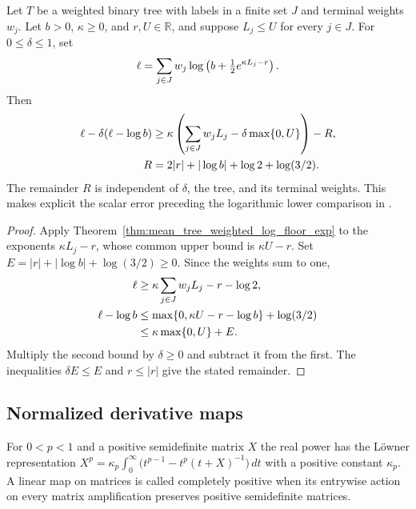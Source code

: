 \begin{theorem}
\label{thm:mean_tree_log_floor_deficit}
\leanok
{}
Let $T$ be a weighted binary tree with labels in a finite set $J$ and
terminal weights $w_j$. Let $b>0$, $\kappa\ge0$, and $r,U\in\mathbb R$,
and suppose $L_j\le U$ for every $j\in J$. For $0\le\delta\le1$, set
\begin{align}
 \ell=\sum_{j\in J}w_j\log\left(b+\tfrac12e^{\kappa L_j-r}\right).
 \notag
\end{align}
Then
\begin{align}
 \ell-\delta(\ell-\log b)
 &\ge\kappa\left(\sum_{j\in J}w_jL_j-\delta\max\{0,U\}\right)
       -R,\notag\\
 R&=2|r|+|\log b|+\log2+\log(3/2).
 \notag
\end{align}
The remainder $R$ is independent of $\delta$, the tree, and its terminal
weights. This makes explicit the scalar error preceding the logarithmic
lower comparison in \cite[Section~8]{OpenAI2026AreaLaw}.
\end{theorem}

\begin{proof}\leanok
{}
Apply Theorem~\ref{thm:mean_tree_weighted_log_floor_exp} to the exponents
$\kappa L_j-r$, whose common upper bound is $\kappa U-r$.
Set $E=|r|+|\log b|+\log(3/2)\ge0$. Since the weights sum to one,
\begin{align}
 \ell&\ge\kappa\sum_{j\in J}w_jL_j-r-\log2,\notag\\
 \ell-\log b
 &\le\max\{0,\kappa U-r-\log b\}+\log(3/2)\notag\\
 &\le\kappa\max\{0,U\}+E.
 \notag
\end{align}
Multiply the second bound by $\delta\ge0$ and subtract it
from the first. The inequalities $\delta E\le E$ and $r\le|r|$ give the
stated remainder.
\end{proof}

\subsection{Normalized derivative maps}

For $0<p<1$ and a positive semidefinite matrix $X$ the real power has the
L\"owner representation
$X^p=\kappa_p\int_0^\infty\bigl(t^{p-1}-t^p(t+X)^{-1}\bigr)\,dt$ with a positive
constant $\kappa_p$. A linear map on matrices is called completely positive when
its entrywise action on every matrix amplification preserves positive
semidefinite matrices.

